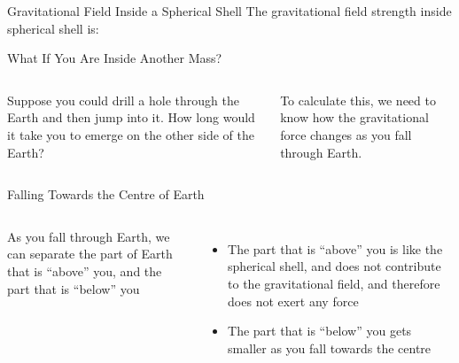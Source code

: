 \documentclass[12pt,compress,aspectratio=169]{beamer}
\begin{document}
\begin{frame}{Gravitational Field Inside a Spherical Shell}
  The gravitational field strength inside spherical shell is:
  \begin{center}
  \end{center}
\end{frame}



\begin{frame}{What If You Are Inside Another Mass?}%
  \begin{columns}


    Suppose you could drill a hole through the Earth and then jump into it. How
    long would it take you to emerge on the other side of the Earth?

    \vspace{.2in}To calculate this, we need to know how the gravitational force
    changes as you fall through Earth.
  \end{columns}
\end{frame}




\begin{frame}{Falling Towards the Centre of Earth}
  \begin{columns}

    As you fall through Earth, we can separate the part of Earth that is
    ``above'' you, and the part that is ``below'' you
    \begin{itemize}
    \item The part that is ``above'' you is like the spherical shell, and does
      not contribute to the gravitational field, and therefore does not exert
      any force
    \item The part that is ``below'' you gets smaller as you fall towards the
      centre
    \end{itemize}
  \end{columns}
\end{frame}
\end{document}
